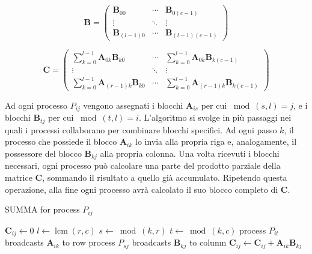 \documentclass[a4paper]{article}
\DeclareMathOperator{\lcm}{lcm}
\begin{document}
$$
    \mathbf{B}=
    \begin{pmatrix}
        \mathbf{B}_{00}     & \cdots & \mathbf{B}_{0(c-1)}     \\
        \vdots              & \ddots & \vdots                  \\
        \mathbf{B}_{(l-1)0} & \cdots & \mathbf{B}_{(l-1)(c-1)}
    \end{pmatrix}
$$

$$
    \mathbf{C}=
    \begin{pmatrix}
        \sum_{k=0}^{l-1}\mathbf{A}_{0k}\mathbf{B}_{k0}     & \cdots & \sum_{k=0}^{l-1}\mathbf{A}_{0k}\mathbf{B}_{k(c-1)}     \\
        \vdots                                             & \ddots & \vdots                                                 \\
        \sum_{k=0}^{l-1}\mathbf{A}_{(r-1)k}\mathbf{B}_{k0} & \cdots & \sum_{k=0}^{l-1}\mathbf{A}_{(r-1)k}\mathbf{B}_{k(c-1)}
    \end{pmatrix}
$$

Ad ogni processo $P_{ij}$ vengono assegnati i blocchi $\mathbf{A}_{is}$ per cui $\bmod(s,l)=j$, e i blocchi $\mathbf{B}_{tj}$ per cui $\bmod(t,l)=i$. L'algoritmo si svolge in più passaggi nei quali i processi collaborano per combinare blocchi specifici. Ad ogni passo $k$, il processo che possiede il blocco $\mathbf{A}_{ik}$ lo invia alla propria riga e, analogamente, il possessore del blocco $\mathbf{B}_{kj}$ alla propria colonna.
Una volta ricevuti i blocchi necessari, ogni processo può calcolare una parte del prodotto parziale della matrice $\mathbf{C}$, sommando il risultato a quello già accumulato. Ripetendo questa operazione, alla fine ogni processo avrà calcolato il suo blocco completo di $\mathbf{C}$.

\begin{algorithm}[h]
    \caption{SUMMA for process $P_{ij}$}
    \begin{algorithmic}
        \State $\mathbf{C}_{ij} \gets 0$
        \State $l \gets \lcm(r,c)$
        \State $s \gets \bmod(k, r)$
        \State $t \gets \bmod(k, c)$
        \State process $P_{it}$ broadcasts $\mathbf{A}_{ik}$ to row
        \State process $P_{sj}$ broadcasts $\mathbf{B}_{kj}$ to column
        \State $\mathbf{C}_{ij} \gets \mathbf{C}_{ij} + \mathbf{A}_{ik}\mathbf{B}_{kj}$
        \EndFor
    \end{algorithmic}
\end{algorithm}
\end{document}
